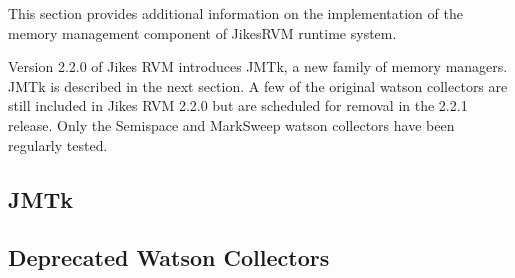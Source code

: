 This section provides additional information on the implementation
of the memory management component of Jikes\trademark RVM runtime system.

Version 2.2.0 of Jikes RVM introduces JMTk, a new family of memory
managers. JMTk is described in the next section. A few of the original
watson collectors are still included in Jikes RVM 2.2.0 but are
scheduled for removal in the 2.2.1 release.  Only the Semispace and
MarkSweep watson collectors have been regularly tested. 
 
\subsection{JMTk}


\subsection{Deprecated Watson Collectors}


